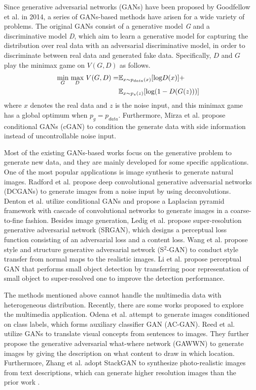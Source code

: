 \documentclass[journal]{IEEEtran}
\begin{document}
Since generative adversarial networks (GANs) have been proposed by Goodfellow et al. \cite{goodfellow2014generative} in 2014, a series of GANs-based methods have arisen for a wide variety of problems. The original GANs consist of a generative model \textit{G} and a discriminative model \textit{D}, which aim to learn a generative model for capturing the distribution over real data with an adversarial discriminative model, in order to discriminate between real data and generated fake data. Specifically, $D$ and $G$ play the minimax game on $V(G,D)$ as follows.
\begin{align}
\underset{G}{\textrm{min}}\ \underset{D}{\textrm{max}}\ V(G,D)=&\mathbb{E}_{x\sim p_{data}(x)}[\textrm{log}D(x)]+ \notag \\
&\mathbb{E}_{x\sim p_{z}(z)}[\textrm{log}(1-D(G(z)))]
\end{align}
where $x$ denotes the real data and $z$ is the noise input, and this minimax game has a global optimum when $p_g=p_{data}$. Furthermore, Mirza et al. \cite{mirza2014conditional} propose conditional GANs (cGAN) to condition the generate data with side information instead of uncontrollable noise input.

Most of the existing GANs-based works focus on the generative problem to generate new data, and they are mainly developed for some specific applications. One of the most popular applications is image synthesis to generate natural images. Radford et al. \cite{radford2015unsupervised} propose deep convolutional generative adversarial networks (DCGANs) to generate images from a noise input by using deconvolutions. Denton et al. \cite{denton2015deep} utilize conditional GANs and propose a Laplacian pyramid framework with cascade of convolutional networks to generate images in a coarse-to-fine fashion. Besides image generation, Ledig et al. \cite{ledig2016photo} propose super-resolution generative adversarial network (SRGAN), which designs a perceptual loss function consisting of an adversarial loss and a content loss. Wang et al. \cite{wang2016generative} propose style and structure generative adversarial network (S$^2$-GAN) to conduct style transfer from normal maps to the realistic images. Li et al. \cite{li2017perceptual} propose perceptual GAN that performs small object detection by transferring poor representation of small object to super-resolved one to improve the detection performance.

The methods mentioned above cannot handle the multimedia data with heterogeneous distribution. Recently, there are some works proposed to explore the multimedia application. Odena et al. \cite{odena2016conditional} attempt to generate images conditioned on class labels, which forms auxiliary classifier GAN (AC-GAN). Reed et al. \cite{reed2016generative} utilize GANs to translate visual concepts from sentences to images. They further propose the generative adversarial what-where network (GAWWN) \cite{reed2016learning} to generate images by giving the description on what content to draw in which location. Furthermore, Zhang et al. \cite{zhang2016stackgan} adopt StackGAN to synthesize photo-realistic images from text descriptions, which can generate higher resolution images than the prior work \cite{reed2016generative}. 
\end{document}
